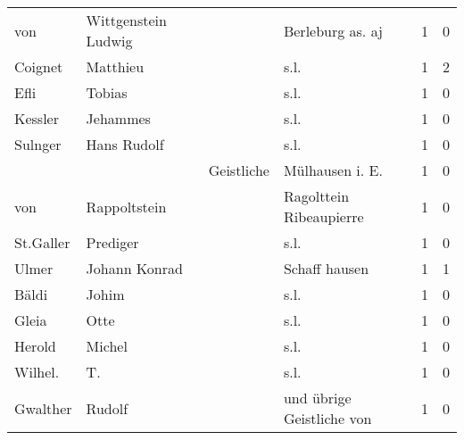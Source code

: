 \begin{center}
\begin{tiny}
\begin{longtabu}{llllrr}
                      von &                Wittgenstein Ludwig &             &                            Berleburg as. aj &          1 &         0 \\
                  Coignet &                           Matthieu &             &                                        s.l. &          1 &         2 \\
                     Efli &                             Tobias &             &                                        s.l. &          1 &         0 \\
                  Kessler &                           Jehammes &             &                                        s.l. &          1 &         0 \\
                  Sulnger &                        Hans Rudolf &             &                                        s.l. &          1 &         0 \\
                          &                                    &  Geistliche &                            Mülhausen i. E.  &          1 &         0 \\
                      von &                       Rappoltstein &             &                     Ragolttein Ribeaupierre &          1 &         0 \\
                St.Galler &                           Prediger &             &                                        s.l. &          1 &         0 \\
                    Ulmer &                      Johann Konrad &             &                               Schaff hausen &          1 &         1 \\
                    Bäldi &                              Johim &             &                                        s.l. &          1 &         0 \\
                    Gleia &                               Otte &             &                                        s.l. &          1 &         0 \\
                   Herold &                             Michel &             &                                        s.l. &          1 &         0 \\
                  Wilhel. &                                 T. &             &                                        s.l. &          1 &         0 \\
                 Gwalther &                             Rudolf &             &                   und übrige Geistliche von &          1 &         0 \\

\end{longtabu}
\end{tiny}
\end{center}
